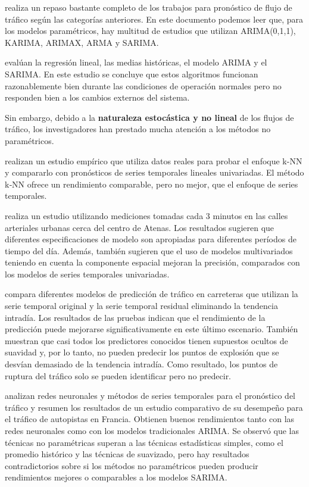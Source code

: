\documentclass[]{book}
\begin{document}
\citep{lv2015traffic} realiza un repaso bastante completo de los
trabajos para pronóstico de flujo de tráfico según las categorías
anteriores. En este documento podemos leer que, para los modelos
paramétricos, hay multitud de estudios que utilizan ARIMA(0,1,1),
KARIMA, ARIMAX, ARMA y SARIMA.

\citep{chung2001short} evalúan la regresión lineal, las medias
históricas, el modelo ARIMA y el SARIMA. En este estudio se concluye que
estos algoritmos funcionan razonablemente bien durante las condiciones
de operación normales pero no responden bien a los cambios externos del
sistema.

Sin embargo, debido a la \textbf{naturaleza estocástica y no lineal} de
los flujos de tráfico, los investigadores han prestado mucha atención a
los métodos no paramétricos.

\citep{davis1991nonparametric} realizan un estudio empírico que utiliza
datos reales para probar el enfoque k-NN y compararlo con pronósticos de
series temporales lineales univariadas. El método k‐NN ofrece un
rendimiento comparable, pero no mejor, que el enfoque de series
temporales.

\citep{stathopoulos2003multivariate} realiza un estudio utilizando
mediciones tomadas cada 3 minutos en las calles arteriales urbanas cerca
del centro de Atenas. Los resultados sugieren que diferentes
especificaciones de modelo son apropiadas para diferentes períodos de
tiempo del día. Además, también sugieren que el uso de modelos
multivariados teniendo en cuenta la componente espacial mejoran la
precisión, comparados con los modelos de series temporales univariadas.

\citep{chen2012retrieval} compara diferentes modelos de predicción de
tráfico en carreteras que utilizan la serie temporal original y la serie
temporal residual eliminando la tendencia intradía. Los resultados de
las pruebas indican que el rendimiento de la predicción puede mejorarse
significativamente en este último escenario. También muestran que casi
todos los predictores conocidos tienen supuestos ocultos de suavidad y,
por lo tanto, no pueden predecir los puntos de explosión que se desvían
demasiado de la tendencia intradía. Como resultado, los puntos de
ruptura del tráfico solo se pueden identificar pero no predecir.

\citep{kirby1997should} analizan redes neuronales y métodos de series
temporales para el pronóstico del tráfico y resumen los resultados de un
estudio comparativo de su desempeño para el tráfico de autopistas en
Francia. Obtienen buenos rendimientos tanto con las redes neuronales
como con los modelos tradicionales ARIMA. Se observó que las técnicas no
paramétricas superan a las técnicas estadísticas simples, como el
promedio histórico y las técnicas de suavizado, pero hay resultados
contradictorios sobre si los métodos no paramétricos pueden producir
rendimientos mejores o comparables a los modelos SARIMA.
\end{document}

